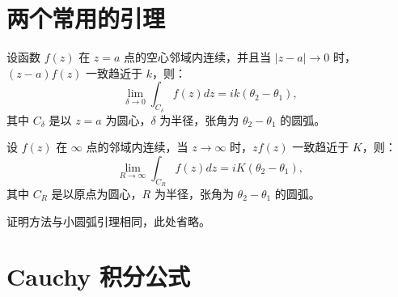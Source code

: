 \section{两个常用的引理}

\begin{lemma}[小圆弧引理]
设函数 \(f(z)\) 在 \(z = a\) 点的空心邻域内连续，并且当 \(|z-a| \to 0\) 时，\((z-a) f(z)\) 一致趋近于 \(k\)，则：
\[
\lim_{\delta \to 0} \int_{C_\delta} f(z) dz = i k (\theta_2 - \theta_1),
\]
其中 \(C_\delta\) 是以 \(z=a\) 为圆心，\(\delta\) 为半径，张角为 \(\theta_2-\theta_1\) 的圆弧。
\end{lemma}


\begin{lemma}[大圆弧引理]
设 \(f(z)\) 在 \(\infty\) 点的邻域内连续，当 \(z \to \infty\) 时，\(z f(z)\) 一致趋近于 \(K\)，则：
\[
\lim_{R \to \infty} \int_{C_R} f(z) dz = i K (\theta_2 - \theta_1),
\]
其中 \(C_R\) 是以原点为圆心，\(R\) 为半径，张角为 \(\theta_2-\theta_1\) 的圆弧。
\end{lemma}

\begin{remark}
    证明方法与小圆弧引理相同，此处省略。
\end{remark}


\section{Cauchy 积分公式}


